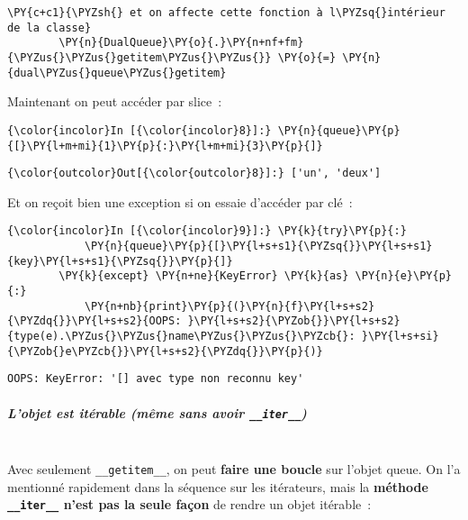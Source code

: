 \begin{Verbatim}[commandchars=\\\{\}]
        \PY{c+c1}{\PYZsh{} et on affecte cette fonction à l\PYZsq{}intérieur de la classe}
        \PY{n}{DualQueue}\PY{o}{.}\PY{n+nf+fm}{\PYZus{}\PYZus{}getitem\PYZus{}\PYZus{}} \PY{o}{=} \PY{n}{dual\PYZus{}queue\PYZus{}getitem}
\end{Verbatim}


    Maintenant on peut accéder par slice~:

    \begin{Verbatim}[commandchars=\\\{\}]
{\color{incolor}In [{\color{incolor}8}]:} \PY{n}{queue}\PY{p}{[}\PY{l+m+mi}{1}\PY{p}{:}\PY{l+m+mi}{3}\PY{p}{]}
\end{Verbatim}


\begin{Verbatim}[commandchars=\\\{\}]
{\color{outcolor}Out[{\color{outcolor}8}]:} ['un', 'deux']
\end{Verbatim}
            
    Et on reçoit bien une exception si on essaie d'accéder par clé~:

    \begin{Verbatim}[commandchars=\\\{\}]
{\color{incolor}In [{\color{incolor}9}]:} \PY{k}{try}\PY{p}{:}
            \PY{n}{queue}\PY{p}{[}\PY{l+s+s1}{\PYZsq{}}\PY{l+s+s1}{key}\PY{l+s+s1}{\PYZsq{}}\PY{p}{]}
        \PY{k}{except} \PY{n+ne}{KeyError} \PY{k}{as} \PY{n}{e}\PY{p}{:}
            \PY{n+nb}{print}\PY{p}{(}\PY{n}{f}\PY{l+s+s2}{\PYZdq{}}\PY{l+s+s2}{OOPS: }\PY{l+s+s2}{\PYZob{}}\PY{l+s+s2}{type(e).\PYZus{}\PYZus{}name\PYZus{}\PYZus{}\PYZcb{}: }\PY{l+s+si}{\PYZob{}e\PYZcb{}}\PY{l+s+s2}{\PYZdq{}}\PY{p}{)}
\end{Verbatim}


    \begin{Verbatim}[commandchars=\\\{\}]
OOPS: KeyError: '[] avec type non reconnu key'

    \end{Verbatim}

    \hypertarget{lobjet-est-ituxe9rable-muxeame-sans-avoir-__iter__}{%
\subparagraph{\texorpdfstring{L'objet est itérable (même sans avoir
\texttt{\_\_iter\_\_})}{L'objet est itérable (même sans avoir \_\_iter\_\_)}\\\\}\label{lobjet-est-ituxe9rable-muxeame-sans-avoir-__iter__}}

    Avec seulement \texttt{\_\_getitem\_\_}, on peut \textbf{faire une
boucle} sur l'objet queue. On l'a mentionné rapidement dans la séquence
sur les itérateurs, mais la \textbf{méthode \texttt{\_\_iter\_\_} n'est
pas la seule façon} de rendre un objet itérable~:

